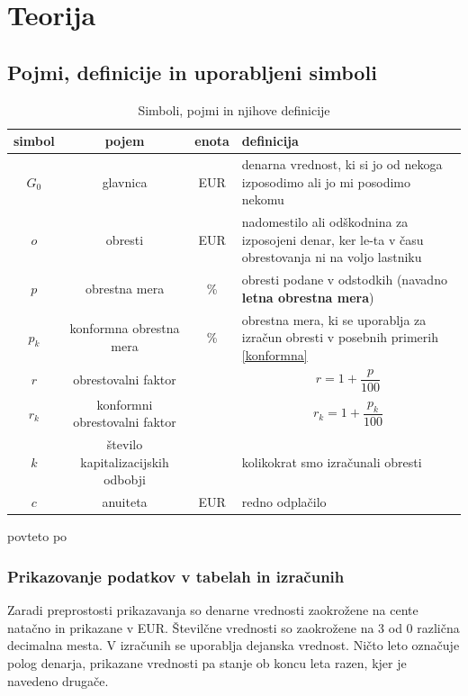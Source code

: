 \documentclass[12pt]{article}
\begin{document}
\section{Teorija}
    \subsection{Pojmi, definicije in uporabljeni simboli}
        \begin{table}[h!]
            \centering
            \begin{tabular}{|c|c|c|p{7cm}|}
                \hline
                \textbf{simbol} & \textbf{pojem} & \textbf{enota} & \textbf{definicija} \\ \hline
                $G_0$ & glavnica                & EUR    & denarna vrednost, ki si jo od nekoga izposodimo ali jo mi posodimo nekomu \\ \hline 
                $o$   & obresti                 & EUR    & nadomestilo ali odškodnina za izposojeni denar, ker le-ta v času obrestovanja ni na voljo lastniku \\ \hline
                $p$   & obrestna mera           & \%     & obresti podane v odstodkih (navadno \textbf{letna obrestna mera}) \\ \hline
                $p_k$ & konformna obrestna mera & \%     & obrestna mera, ki se uporablja za izračun obresti v posebnih primerih \ref{konformna} \\ \hline
                $r$   & obrestovalni faktor     &        & $$r = 1 + \frac{p}{100}$$ \\ \hline
                $r_k$ & konformni obrestovalni faktor &  & $$r_k = 1 + \frac{p_k}{100}$$ \\ \hline
                $k$   & število kapitalizacijskih odbobji &  & kolikokrat smo izračunali obresti \\ \hline
                $c$   & anuiteta                & EUR    & redno odplačilo \\ \hline
            \end{tabular}

            \medskip
            \centering povteto po \cite{vega4}
            \caption{Simboli, pojmi in njihove definicije}
            \label{tab:simboli}
        \end{table}

        \subsubsection{Prikazovanje podatkov v tabelah in izračunih}
        Zaradi preprostosti prikazavanja so denarne vrednosti zaokrožene na cente natačno
        in prikazane v EUR. Številčne vrednosti so zaokrožene na 3 od 0 različna decimalna 
        mesta. V izračunih se uporablja dejanska vrednost. Ničto leto označuje polog denarja,
        prikazane vrednosti pa stanje ob koncu leta razen, kjer je navedeno drugače. 
\end{document}
